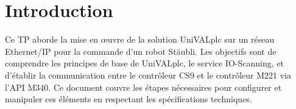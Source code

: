 
\section{Introduction}
Ce TP aborde la mise en œuvre de la solution UniVALplc sur un réseau Ethernet/IP pour la commande d'un robot Stäubli.
Les objectifs sont de comprendre les principes de base de UniVALplc, le service IO-Scanning, et d’établir la communication
entre le contrôleur CS9 et le contrôleur M221 via l'API M340. Ce document couvre les étapes nécessaires pour configurer
et manipuler ces éléments en respectant les spécifications techniques.
